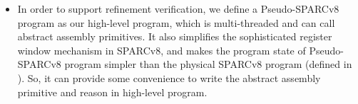 \begin{itemize}
	
	

    \item 
    In order to support refinement verification, we define a 
    Pseudo-SPARCv8 program as our high-level program, which 
    is multi-threaded and can call abstract 
    assembly primitives. It also simplifies 
    the sophisticated register window mechanism in SPARCv8, 
    and makes the program state of Pseudo-SPARCv8 program 
    simpler than the physical SPARCv8 program 
    (defined in \Sec{\ref{sec:modeling}}). 
    So, it can provide some convenience 
    to write the abstract assembly primitive 
    and reason in high-level program. 
    

\end{itemize}
